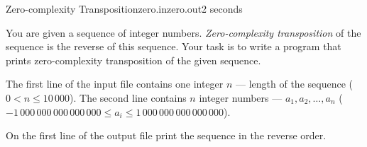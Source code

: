\begin{problem}{Zero-complexity Transposition}{zero.in}{zero.out}{2 seconds}

You are given a sequence of integer numbers. \emph{Zero-complexity transposition}
of the sequence is the reverse of this sequence. Your task is to write a program 
that prints zero-complexity transposition of the given sequence.

\InputFile

The first line of the input file contains one integer $n$ --- length of the 
sequence ($0 < n \le 10\,000$). The second line contains $n$ integer numbers --- 
$a_1, a_2, \dots, a_n$ ($-1\,000\,000\,000\,000\,000 \le a_i \le 1\,000\,000\,000\,000\,000$).

\OutputFile

On the first line of the output file print the sequence in the reverse order.

\Example

\begin{example}
%
%
\end{example}

\end{problem}
